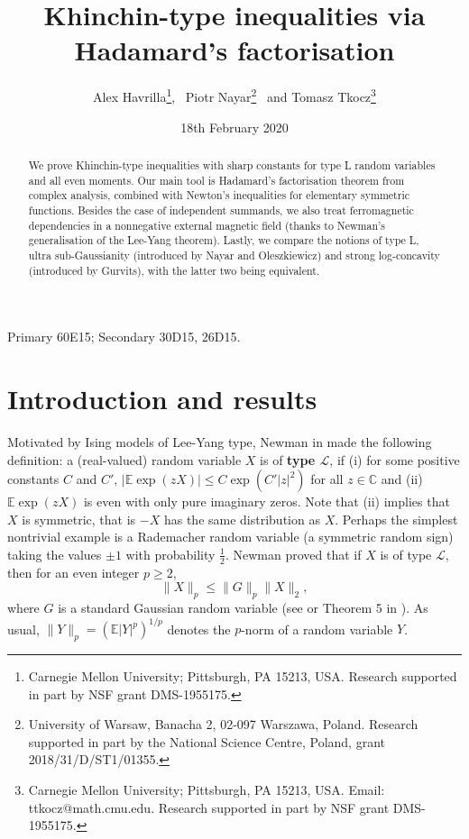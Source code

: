 \documentclass[10pt]{article}
\title{\vspace{-3em}
Khinchin-type inequalities via Hadamard's factorisation
}
\author{Alex Havrilla\thanks{Carnegie Mellon University; Pittsburgh, PA 15213, USA. Research supported in part by NSF grant DMS-1955175.}, \ Piotr Nayar\thanks{\linespread{1.0} University of Warsaw, Banacha 2, 02-097 Warszawa, Poland. Research supported in part by the National Science Centre, Poland, grant 2018/31/D/ST1/01355.}
\ and 
Tomasz Tkocz\thanks{\linespread{1.0} Carnegie Mellon University; Pittsburgh, PA 15213, USA. Email: ttkocz@math.cmu.edu. Research supported in part by NSF grant DMS-1955175.}
\date{18th February 2020}
}
\newcommand{\E}{\mathbb{E}}
\newcommand{\1}{\textbf{1}}
\newcommand{\C}{\mathbb{C}}
\theoremstyle{remark}
\theoremstyle{definition}
\begin{document}
\maketitle

\begin{abstract}
We prove Khinchin-type inequalities with sharp constants for type L random variables and all even moments. Our main tool is Hadamard's factorisation theorem from complex analysis, combined with Newton's inequalities for elementary symmetric functions. Besides the case of independent summands, we also treat ferromagnetic dependencies in a nonnegative external magnetic field (thanks to Newman's generalisation of the Lee-Yang theorem). Lastly, we compare the notions of type L, ultra sub-Gaussianity (introduced by Nayar and Oleszkiewicz) and strong log-concavity (introduced by Gurvits), with the latter two being equivalent.
\end{abstract}

\bigskip

\begin{footnotesize}
 Primary 60E15; Secondary 30D15, 26D15.

\end{footnotesize}

\bigskip



\section{Introduction and results}

Motivated by Ising models of Lee-Yang type, Newman in \cite{N1} made the following definition: a (real-valued) random variable $X$ is of \textbf{type $\mathscr{L}$}, if (i) for some positive constants $C$ and $C'$, $|\E\exp(zX)| \leq C\exp(C'|z|^2)$ for all $z \in \C$ and (ii) $\E\exp(zX)$ is even with only pure imaginary zeros. Note that (ii) implies that $X$ is symmetric, that is $-X$ has the same distribution as $X$. Perhaps the simplest nontrivial example is a Rademacher random variable (a symmetric random sign) taking the values $\pm 1$ with probability $\frac{1}{2}$.
Newman proved that if $X$ is of type $\mathscr{L}$, then for an even integer $p \geq 2$,
\[
\|X\|_p \leq \|G\|_p\|X\|_2,
\]
where $G$ is a standard Gaussian random variable (see \cite{N2} or Theorem 5 in \cite{N1}). As usual, $\|Y\|_p = (\E |Y|^p)^{1/p}$ denotes the $p$-norm of a random variable $Y$.
\end{document}
